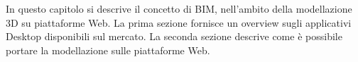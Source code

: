 In questo capitolo si descrive il concetto di BIM,
nell'ambito della modellazione 3D su piattaforme Web. La prima sezione fornisce
un overview sugli applicativi Desktop disponibili sul mercato. La seconda sezione
descrive come è possibile portare la modellazione sulle piattaforme Web.
